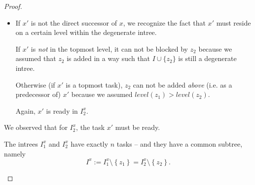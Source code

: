\begin{proof}
\begin{itemize}
\begin{itemize}
    \item If $x'$ is not the direct successor of $x$, we recognize the fact that $x'$ must reside on a certain level within the degenerate intree. 

      If $x'$ is \emph{not} in the topmost level, it can not be blocked by $z_2$ because we assumed that $z_2$ is added in a way such that $I\cup\{z_2\}$ is still a degenerate intree.

      Otherwise (if $x'$ is a topmost task), $z_2$ can not be added \emph{above} (i.e. as a predecessor of) $x'$ because we assumed $level(z_1)>level(z_2)$.

      Again, $x'$ is ready in $I_2^x$.

    \end{itemize}
    We observed that for $I_2^x$, the task $x'$ must be ready.
    
    The intrees $I^x_{1}$ and $I^x_{2}$ have exactly $n$ tasks -- and they have a common subtree, namely
    \begin{equation*}
      I^x := I^x_{1}\setminus\left\{ z_1 \right\}=I^x_{2}\setminus\left\{ z_2 \right\}.
    \end{equation*}


\end{itemize}
\end{proof}
